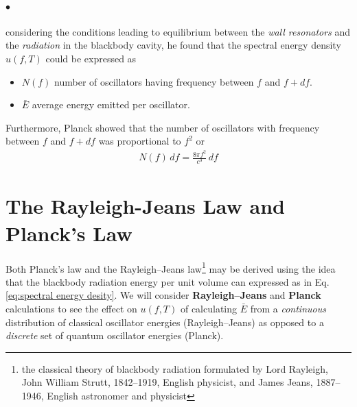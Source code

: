 \documentclass[a4paper]{report}
\begin{document}
            \paragraph{$\bullet$}  considering the conditions leading to equilibrium between the \textit{wall resonators}
            and the \textit{radiation} in the blackbody cavity, he found that the 
            spectral energy density $u(f, T)$ could be expressed as
            {\tiny \begin{itemize}
                \item $N(f)$ number of oscillators having frequency between $f$ and $f + df$.
                \item $\bar{E}$ average energy emitted per oscillator.
            \end{itemize}}

            Furthermore, Planck showed that the number of oscillators with frequency
            between $f$ and $f + df$ was proportional to $f^2$ or 
            \begin{align}
                \label{eq:number of oscillator}
                N(f)\, df = \frac{8 \pi f^2}{c^3} \, df
            \end{align}

        \section{The Rayleigh-Jeans Law and Planck's Law}
            Both Planck’s law and the Rayleigh–Jeans law\footnote{the classical theory of blackbody radiation formulated by 
            Lord Rayleigh, John William Strutt, 1842–1919, English physicist, and James Jeans, 1887–1946, English 
            astronomer and physicist} may be derived using the idea that the blackbody radiation energy per unit volume can expressed
            as in Eq.\eqref{eq:spectral energy desity}. We will consider \textbf{Rayleigh–Jeans} and \textbf{Planck} calculations 
            to see the effect on $u(f, T)$ of calculating $\bar{E}$ from a \textit{continuous} distribution of classical oscillator energies 
            (Rayleigh–Jeans) as opposed to a \textit{discrete} set of quantum oscillator energies (Planck).
\end{document}
